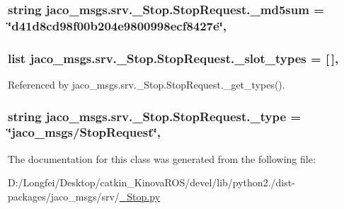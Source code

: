 \subsubsection[{\texorpdfstring{\+\_\+md5sum}{_md5sum}}]{\setlength{\rightskip}{0pt plus 5cm}string jaco\+\_\+msgs.\+srv.\+\_\+\+Stop.\+Stop\+Request.\+\_\+md5sum = \char`\"{}d41d8cd98f00b204e9800998ecf8427e\char`\"{}\hspace{0.3cm}{\ttfamily [static]}, {\ttfamily [private]}}\hypertarget{classjaco__msgs_1_1srv_1_1__Stop_1_1StopRequest_a0dd5352b33def693ef7e404ed624950e}{}\label{classjaco__msgs_1_1srv_1_1__Stop_1_1StopRequest_a0dd5352b33def693ef7e404ed624950e}
\subsubsection[{\texorpdfstring{\+\_\+slot\+\_\+types}{_slot_types}}]{\setlength{\rightskip}{0pt plus 5cm}list jaco\+\_\+msgs.\+srv.\+\_\+\+Stop.\+Stop\+Request.\+\_\+slot\+\_\+types = \mbox{[}$\,$\mbox{]}\hspace{0.3cm}{\ttfamily [static]}, {\ttfamily [private]}}\hypertarget{classjaco__msgs_1_1srv_1_1__Stop_1_1StopRequest_a7b1a0eda37fa2badce0000b0a554e4f3}{}\label{classjaco__msgs_1_1srv_1_1__Stop_1_1StopRequest_a7b1a0eda37fa2badce0000b0a554e4f3}


Referenced by jaco\+\_\+msgs.\+srv.\+\_\+\+Stop.\+Stop\+Request.\+\_\+get\+\_\+types().

\subsubsection[{\texorpdfstring{\+\_\+type}{_type}}]{\setlength{\rightskip}{0pt plus 5cm}string jaco\+\_\+msgs.\+srv.\+\_\+\+Stop.\+Stop\+Request.\+\_\+type = \char`\"{}jaco\+\_\+msgs/{\bf Stop\+Request}\char`\"{}\hspace{0.3cm}{\ttfamily [static]}, {\ttfamily [private]}}\hypertarget{classjaco__msgs_1_1srv_1_1__Stop_1_1StopRequest_a5ce51a377c3c216314931ea5d763ecb9}{}\label{classjaco__msgs_1_1srv_1_1__Stop_1_1StopRequest_a5ce51a377c3c216314931ea5d763ecb9}


The documentation for this class was generated from the following file\+:\begin{DoxyCompactItemize}
\item 
D\+:/\+Longfei/\+Desktop/catkin\+\_\+\+Kinova\+R\+O\+S/devel/lib/python2./dist-\/packages/jaco\+\_\+msgs/srv/\hyperlink{__Stop_8py}{\+\_\+\+Stop.\+py}\end{DoxyCompactItemize}
